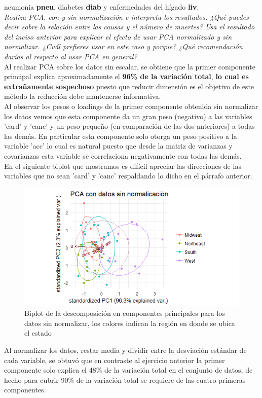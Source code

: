 \documentclass[paper=letter, fontsize=11pt]{scrartcl}
\numberwithin{equation}{section} %
\numberwithin{figure}{section} %
\numberwithin{table}{section} %
\begin{document}
\begin{enumerate}
{neumonia \textbf{pneu}, diabetes \textbf{diab} y enfermedades del hígado \textbf{liv}.}\\
\textit{Realiza PCA, con y sin normalización e interpreta los resultados. ¿Qué puedes decir sobre la relación entre las causas y el número de muertes? Usa el resultado del inciso anterior para explicar el efecto de usar PCA normalizado y sin normalizar. ¿Cuál prefieres usar en este caso y porque? ¿Qué recomendación darías al respecto al usar PCA en general? }\\
Al realizar PCA sobre los datos sin escalar, se obtiene que la primer componente principal explica aproximadamente el\textbf{ 96\% de la variación total}, \textbf{lo cual es extrañamente sospechoso} puesto que reducir dimensión es el objetivo de este método la reducción debe mantenerse informativa. \\

Al observar los pesos o loadings de la primer componente obtenida sin normalizar los datos vemos que esta componente da un gran peso (negativo) a las variables 'card' y 'canc' y un peso pequeño (en comparación de las dos anteriores) a todas las demás. En particular esta componente solo otorga un peso positivo a la variable 'acc' lo cual es natural puesto que desde la matriz de varianzas y covarianzas esta variable se correlaciona negativamente con todas las demás.\\
En el siguiente biplot que mostramos es difícil apreciar las direcciones de las variables que no sean 'card' y 'canc' respaldando lo dicho en el párrafo anterior.
\begin{figure}[H]
  \begin{center}
    \includegraphics[scale=.95]{pca_sin_normalizar.png}
    \caption{Biplot de la descomposición en componentes principales para los datos sin normalizar, los colores indican la región en donde se ubica el estado   }
    \label{fig:pca_sin}
  \end{center}
\end{figure}
Al normalizar los datos, restar media y dividir entre la desviación estándar de cada variable, se obtuvó que en contraste al ejercicio anterior la primer componente solo explica el 48\% de la variación total en el conjunto de datos, de hecho para cubrir 90\% de la variación total se requiere de las cuatro primeras componentes.\\


\end{enumerate}
\end{document}
